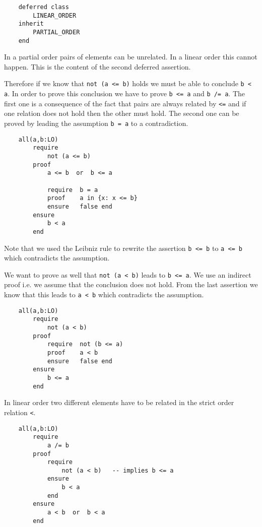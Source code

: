 \begin{lstlisting}
    deferred class
        LINEAR_ORDER
    inherit
        PARTIAL_ORDER
    end
\end{lstlisting}

In a partial order pairs of elements can be unrelated. In a linear order this
cannot happen. This is the content of the second deferred assertion.

Therefore if we know that \lstinline!not (a <= b)! holds we must be able to
conclude \lstinline!b < a!. In order to prove this conclusion we have to prove
\lstinline!b <= a! and \lstinline!b /= a!. The first one is a consequence of
the fact that pairs are always related by \lstinline!<=! and if one relation
does not hold then the other must hold. The second one can be proved by
leading the assumption \lstinline!b = a! to a contradiction.

\begin{lstlisting}
    all(a,b:LO)
        require
            not (a <= b)
        proof
            a <= b  or  b <= a

            require  b = a
            proof    a in {x: x <= b}
            ensure   false end
        ensure
            b < a
        end
\end{lstlisting}
%
Note that we used the Leibniz rule to rewrite the assertion \lstinline!b <= b!
to \lstinline!a <= b! which contradicts the assumption.

We want to prove as well that \lstinline!not (a < b)!  leads to
\lstinline!b <= a!. We use an indirect proof i.e. we assume that the
conclusion does not hold. From the last assertion we know that this leads to
\lstinline!a < b!  which contradicts the assumption.

\begin{lstlisting}
    all(a,b:LO)
        require
            not (a < b)
        proof
            require  not (b <= a)
            proof    a < b
            ensure   false end
        ensure
            b <= a
        end
\end{lstlisting}

In linear order two different elements have to be related in the strict order
relation \lstinline!<!.

\begin{lstlisting}
    all(a,b:LO)
        require
            a /= b
        proof
            require
                not (a < b)   -- implies b <= a
            ensure
                b < a
            end
        ensure
            a < b  or  b < a
        end
\end{lstlisting}


